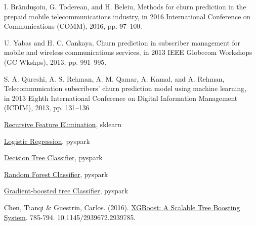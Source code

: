 \documentclass[LaM,binding=0.6cm, english]{sapthesis}
\begin{document}
\begin{thebibliography}{9}
I. Brânduşoiu, G. Toderean, and H. Beleiu, Methods for churn prediction in the prepaid mobile telecommunications industry, in 2016 International Conference on Communications (COMM), 2016, pp. 97–100.

U. Yabas and H. C. Cankaya, Churn prediction in subscriber management for mobile and wireless communications services, in 2013 IEEE Globecom Workshops (GC Wkshps), 2013, pp. 991–995.

S. A. Qureshi, A. S. Rehman, A. M. Qamar, A. Kamal, and A. Rehman, Telecommunication subscribers’ churn prediction model using machine learning, in 2013 Eighth International Conference on Digital Information Management (ICDIM), 2013, pp. 131–136

\href{https://www.scikit-yb.org/en/latest/api/model_selection/rfecv.html}{Recursive Feature Elimination}, sklearn

\href{https://spark.apache.org/docs/latest/api/python/pyspark.ml.html#pyspark.ml.classification.LogisticRegression}{Logistic Regression}, pyspark

\href{https://spark.apache.org/docs/latest/api/python/pyspark.ml.html#pyspark.ml.classification.DecisionTreeClassifier}{Decision Tree Classifier}, pyspark

\href{https://spark.apache.org/docs/latest/api/python/pyspark.ml.html#pyspark.ml.classification.RandomForestClassifier}{Random Forest Classifier}, pyspark

\href{https://spark.apache.org/docs/latest/api/python/pyspark.ml.html#pyspark.ml.classification.GBTClassifier}{Gradient-boosted tree Classifier}, pyspark

Chen, Tianqi \& Guestrin, Carlos. (2016). \href{https://www.researchgate.net/publication/310824798_XGBoost_A_Scalable_Tree_Boosting_System}{XGBoost: A Scalable Tree Boosting System}. 785-794. 10.1145/2939672.2939785.

\end{thebibliography}
\end{document}
